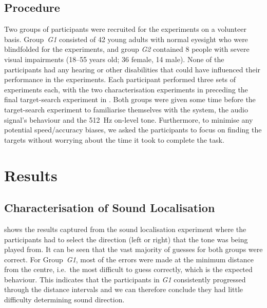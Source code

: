\documentclass[]{interact}
\begin{document}

\subsection{Procedure}

Two groups of participants were recruited for the experiments on a volunteer basis. 
Group~\textit{G1} consisted of 42 young adults with normal eyesight who were blindfolded for the experiments, and group \textit{G2} contained 8 people with severe visual impairments (18--55 years old; 36 female, 14 male). 
None of the participants had any hearing or other disabilities that could have influenced their performance in the experiments.
Each participant performed three sets of experiments each, with the two characterisation experiments in  preceding the final target-search experiment in . 
Both groups were given some time before the target-search experiment to familiarise themselves with the system, the audio signal's behaviour and the \SI{512}{\hertz} on-level tone. 
Furthermore, to minimise any potential speed/accuracy biases, we asked the participants to focus on finding the targets without worrying about the time it took to complete the task. 

\section{Results}\label{sec:results}

\subsection{Characterisation of Sound Localisation}

 shows the results captured from the sound localisation experiment where the participants had to select the direction (left or right) that the tone was being played from. 
%
It can be seen that the vast majority of guesses for both groups were correct.
For Group~\textit{G1}, most of the errors were made at the minimum distance from the centre, i.e.\ the most difficult to guess correctly, which is the expected behaviour.
This indicates that the participants in \textit{G1} consistently progressed through the distance intervals and we can therefore conclude they had little difficulty determining sound direction.
\end{document}

